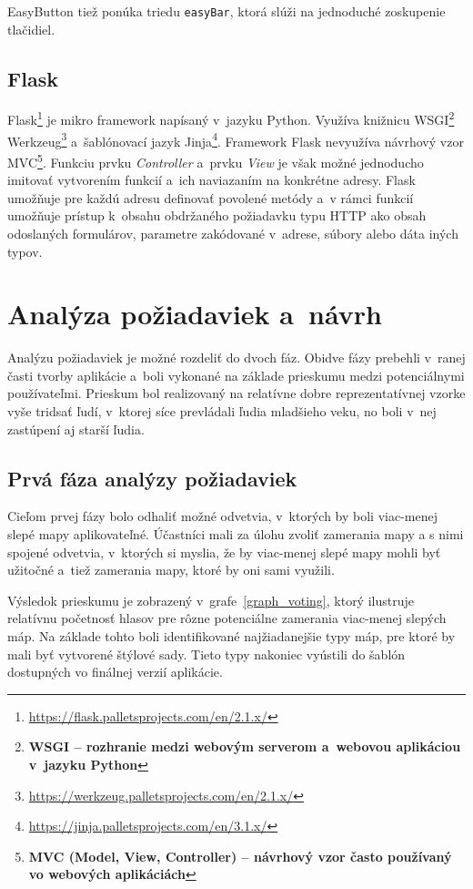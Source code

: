 EasyButton tiež ponúka triedu {\tt easyBar}, ktorá slúži na jednoduché zoskupenie tlačidiel.

\section{Flask}
\label{flask}
Flask\footnote{\url{https://flask.palletsprojects.com/en/2.1.x/}} je mikro framework napísaný v~jazyku Python. Využíva knižnicu WSGI\footnote{\bf WSGI \rm -- rozhranie medzi webovým serverom a~webovou aplikáciou v~jazyku Python} Werkzeug\footnote{\url{https://werkzeug.palletsprojects.com/en/2.1.x/}} a~šablónovací jazyk Jinja\footnote{\url{https://jinja.palletsprojects.com/en/3.1.x/}}. Framework Flask nevyužíva návrhový vzor MVC\footnote{\bf MVC \rm (Model, View, Controller) -- návrhový vzor často používaný vo webových aplikáciách}. Funkciu prvku {\it Controller} a~prvku {\it View} je však možné jednoducho imitovať vytvorením funkcií a~ich naviazaním na konkrétne adresy. Flask umožňuje pre každú adresu definovať povolené metódy a~v rámci funkcií umožňuje prístup k~obsahu obdržaného požiadavku typu HTTP ako obsah odoslaných formulárov, parametre zakódované v~adrese, súbory alebo dáta iných typov.


\chapter{Analýza požiadaviek a~návrh}
\label{idea}
Analýzu požiadaviek je možné rozdeliť do dvoch fáz. Obidve fázy prebehli v~ranej časti tvorby aplikácie a~boli vykonané na základe prieskumu medzi potenciálnymi používateľmi. Prieskum bol realizovaný na relatívne dobre reprezentatívnej vzorke vyše tridsať ľudí, v~ktorej síce prevládali ľudia mladšieho veku, no boli v~nej zastúpení aj starší ľudia. 

\section{Prvá fáza analýzy požiadaviek}
Cieľom prvej fázy bolo odhaliť možné odvetvia, v~ktorých by boli viac-menej slepé mapy aplikovateľné. Účastníci mali za úlohu zvoliť zamerania mapy a s nimi spojené odvetvia, v~ktorých si myslia, že by viac-menej slepé mapy mohli byť užitočné a~tiež zamerania mapy, ktoré by oni sami využili. 

Výsledok prieskumu je zobrazený v~grafe~\ref{graph_voting}, ktorý ilustruje relatívnu početnosť hlasov pre rôzne potenciálne zamerania viac-menej slepých máp. Na základe tohto boli identifikované najžiadanejšie typy máp, pre ktoré by mali byť vytvorené štýlové sady. Tieto typy nakoniec vyústili do šablón dostupných vo finálnej verzií aplikácie.

